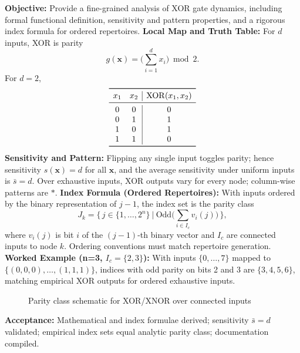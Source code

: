 \textbf{Objective:} Provide a fine-grained analysis of XOR gate dynamics, including formal functional definition, sensitivity and pattern properties, and a rigorous index formula for ordered repertoires.
\textbf{Local Map and Truth Table:} For \(d\) inputs, XOR is parity
\[
g(\mathbf{x}) = \big(\sum_{i=1}^{d} x_i\big)\bmod 2.
\]
For \(d=2\),
\[
\begin{array}{cc|c}
\toprule
 x_1 & x_2 & \mathrm{XOR}(x_1,x_2) \\
\midrule
 0 & 0 & 0 \\
 0 & 1 & 1 \\
 1 & 0 & 1 \\
 1 & 1 & 0 \\
\bottomrule
\end{array}
\]
\textbf{Sensitivity and Pattern:} Flipping any single input toggles parity; hence sensitivity \(s(\mathbf{x})=d\) for all \(\mathbf{x}\), and the average sensitivity under uniform inputs is \(\bar{s}=d\). Over exhaustive inputs, XOR outputs vary for every node; column-wise patterns are \(*\).
\textbf{Index Formula (Ordered Repertoires):} With inputs ordered by the binary representation of \(j-1\), the index set is the parity class
\[
J_k=\big\{\,j\in\{1,\dots,2^n\}\ \big|\ \mathrm{Odd}\big(\sum_{i\in I_c} v_i(j)\big)\,\big\},
\]
where \(v_i(j)\) is bit \(i\) of the \((j-1)\)-th binary vector and \(I_c\) are connected inputs to node \(k\). Ordering conventions must match repertoire generation.
\textbf{Worked Example (n=3, \(I_c=\{2,3\}\)):} With inputs \(\{0,\dots,7\}\) mapped to \(\{(0,0,0),\dots,(1,1,1)\}\), indices with odd parity on bits 2 and 3 are \(\{3,4,5,6\}\), matching empirical XOR outputs for ordered exhaustive inputs.
\begin{figure}[h]
\centering
{}
\caption{Parity class schematic for XOR/XNOR over connected inputs}
\end{figure}
\textbf{Acceptance:} Mathematical and index formulae derived; sensitivity \(\bar{s}=d\) validated; empirical index sets equal analytic parity class; documentation compiled.


